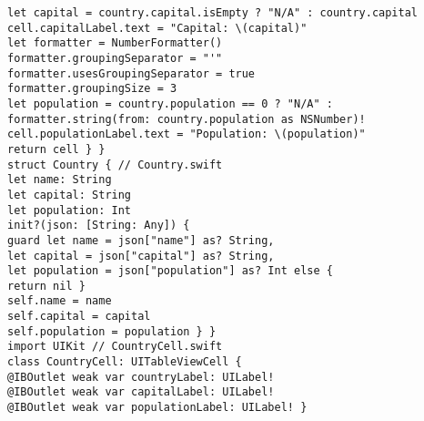 \begin{lstlisting}
let capital = country.capital.isEmpty ? "N/A" : country.capital
cell.capitalLabel.text = "Capital: \(capital)"
let formatter = NumberFormatter()
formatter.groupingSeparator = "'"
formatter.usesGroupingSeparator = true
formatter.groupingSize = 3
let population = country.population == 0 ? "N/A" : formatter.string(from: country.population as NSNumber)!
cell.populationLabel.text = "Population: \(population)"
return cell } }
struct Country { // Country.swift
let name: String
let capital: String
let population: Int
init?(json: [String: Any]) {
guard let name = json["name"] as? String,
let capital = json["capital"] as? String,
let population = json["population"] as? Int else {
return nil }
self.name = name
self.capital = capital
self.population = population } }
import UIKit // CountryCell.swift
class CountryCell: UITableViewCell {
@IBOutlet weak var countryLabel: UILabel!
@IBOutlet weak var capitalLabel: UILabel!
@IBOutlet weak var populationLabel: UILabel! }
\end{lstlisting}

